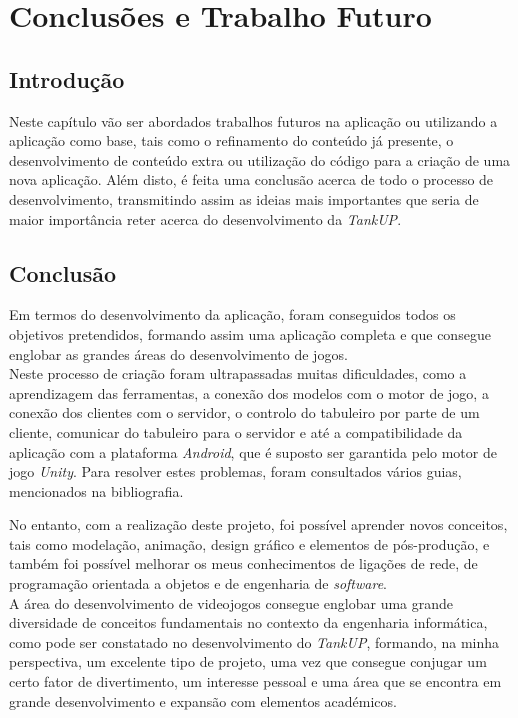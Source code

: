 \chapter{Conclusões e Trabalho Futuro}
\label{chap:futuroC}

\section{Introdução}
\label{chap7:sec:intro}
Neste capítulo vão ser abordados trabalhos futuros na aplicação ou utilizando a aplicação como base, tais como o refinamento do conteúdo já presente, o desenvolvimento de conteúdo extra ou utilização do código para a criação de uma nova aplicação. Além disto, é feita uma conclusão acerca de todo o processo de desenvolvimento, transmitindo assim as ideias mais importantes que seria de maior importância reter acerca do desenvolvimento da \emph{TankUP}.


\section{Conclusão}
\label{chap7:sec:conc}
Em termos do desenvolvimento da aplicação, foram conseguidos todos os objetivos pretendidos, formando assim uma aplicação completa e que consegue englobar as grandes áreas do desenvolvimento de jogos.\\

Neste processo de criação foram ultrapassadas muitas dificuldades, como a aprendizagem das ferramentas, a conexão dos modelos com o motor de jogo, a conexão dos clientes com o servidor, o controlo do tabuleiro por parte de um cliente, comunicar do tabuleiro para o servidor e até a compatibilidade da aplicação com a plataforma \emph{Android}, que é suposto ser garantida pelo motor de jogo \emph{Unity}.
Para resolver estes problemas, foram consultados vários guias, mencionados na bibliografia. 

No entanto, com a realização deste projeto, foi possível aprender novos conceitos, tais como modelação, animação, design gráfico e elementos de pós-produção, e também foi possível melhorar os meus conhecimentos de ligações de rede, de programação orientada a objetos e de engenharia de \textit{software}.\\

A área do desenvolvimento de videojogos consegue englobar uma grande diversidade de conceitos fundamentais no contexto da engenharia informática, como pode ser constatado no desenvolvimento do \emph{TankUP}, formando, na minha perspectiva, um excelente tipo de projeto, uma vez que consegue conjugar um certo fator de divertimento, um interesse pessoal e uma área que se encontra em grande desenvolvimento e expansão com elementos académicos.

